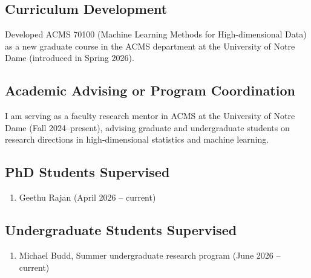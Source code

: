 \documentclass[letterpaper,oneside]{article}
\begin{document}
\subsection*{Curriculum Development}

\noindent Developed ACMS 70100 (Machine Learning Methods for High-dimensional Data) as a new graduate course in the ACMS department at the University of Notre Dame (introduced in Spring 2026).

\subsection*{Academic Advising or Program Coordination}

\noindent I am serving as a faculty research mentor in ACMS at the University of Notre Dame (Fall 2024--present), advising graduate and undergraduate students on research directions in high-dimensional statistics and machine learning.

\subsection*{PhD Students Supervised}

\begin{enumerate}
	\item Geethu Rajan (April 2026 -- current)
\end{enumerate}
%
%

\subsection*{Undergraduate Students Supervised}

\begin{enumerate}
	\item Michael Budd, Summer undergraduate research program (June 2026 -- current)
\end{enumerate}
%
%
%

\end{document}
